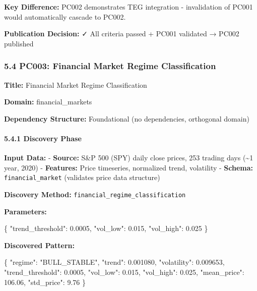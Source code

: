 \documentclass[
]{article}
\newenvironment{Shaded}{}{}
\newcommand{\DataTypeTok}[1]{\textcolor[rgb]{0.56,0.13,0.00}{#1}}
\newcommand{\FloatTok}[1]{\textcolor[rgb]{0.25,0.63,0.44}{#1}}
\newcommand{\FunctionTok}[1]{\textcolor[rgb]{0.02,0.16,0.49}{#1}}
\newcommand{\StringTok}[1]{\textcolor[rgb]{0.25,0.44,0.63}{#1}}
\begin{document}
\textbf{Key Difference:} PC002 demonstrates TEG integration -
invalidation of PC001 would automatically cascade to PC002.

\textbf{Publication Decision:} ✓ All criteria passed + PC001 validated →
PC002 published

\subsubsection{5.4 PC003: Financial Market Regime
Classification}\label{pc003-financial-market-regime-classification}

\textbf{Title:} Financial Market Regime Classification

\textbf{Domain:} financial\_markets

\textbf{Dependency Structure:} Foundational (no dependencies, orthogonal
domain)

\paragraph{5.4.1 Discovery Phase}\label{discovery-phase-1}

\textbf{Input Data:} - \textbf{Source:} S\&P 500 (SPY) daily close
prices, 253 trading days (\textasciitilde1 year, 2020) -
\textbf{Features:} Price timeseries, normalized trend, volatility -
\textbf{Schema:} \texttt{financial\_market} (validates price data
structure)

\textbf{Discovery Method:} \texttt{financial\_regime\_classification}

\textbf{Parameters:}

\begin{Shaded}
\begin{Highlighting}[]
\FunctionTok{\{}
  \DataTypeTok{"trend\_threshold"}\FunctionTok{:} \FloatTok{0.0005}\FunctionTok{,}
  \DataTypeTok{"vol\_low"}\FunctionTok{:} \FloatTok{0.015}\FunctionTok{,}
  \DataTypeTok{"vol\_high"}\FunctionTok{:} \FloatTok{0.025}
\FunctionTok{\}}
\end{Highlighting}
\end{Shaded}

\textbf{Discovered Pattern:}

\begin{Shaded}
\begin{Highlighting}[]
\FunctionTok{\{}
  \DataTypeTok{"regime"}\FunctionTok{:} \StringTok{"BULL\_STABLE"}\FunctionTok{,}
  \DataTypeTok{"trend"}\FunctionTok{:} \FloatTok{0.001080}\FunctionTok{,}
  \DataTypeTok{"volatility"}\FunctionTok{:} \FloatTok{0.009653}\FunctionTok{,}
  \DataTypeTok{"trend\_threshold"}\FunctionTok{:} \FloatTok{0.0005}\FunctionTok{,}
  \DataTypeTok{"vol\_low"}\FunctionTok{:} \FloatTok{0.015}\FunctionTok{,}
  \DataTypeTok{"vol\_high"}\FunctionTok{:} \FloatTok{0.025}\FunctionTok{,}
  \DataTypeTok{"mean\_price"}\FunctionTok{:} \FloatTok{106.06}\FunctionTok{,}
  \DataTypeTok{"std\_price"}\FunctionTok{:} \FloatTok{9.76}
\FunctionTok{\}}
\end{Highlighting}
\end{Shaded}
\end{document}
